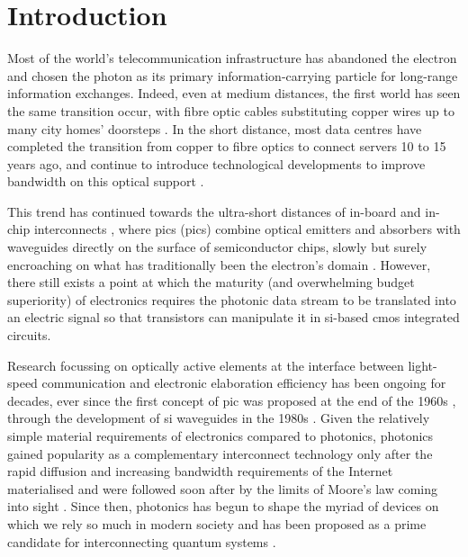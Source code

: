 \chapter{Introduction}
\label{chap:introduction}

Most of the world's telecommunication infrastructure has abandoned the electron and chosen the photon as its primary information-carrying particle for long-range information exchanges. Indeed, even at medium distances, the first world has seen the same transition occur, with fibre optic cables substituting copper wires up to many city homes' doorsteps \cite{ECBroadband, ETNOBroadband}. In the short distance, most data centres have completed the transition from copper to fibre optics to connect servers \num{10} to \num{15} years ago, and continue to introduce technological developments to improve bandwidth on this optical support \cite{Cheng2018}. 

This trend has continued towards the ultra-short distances of in-board and in-chip interconnects \cite{Benner2005}, where \acl{pic}s (\acs{pic}s) combine optical emitters and absorbers with waveguides directly on the surface of semiconductor chips, slowly but surely encroaching on what has traditionally been the electron's domain \cite{Shekhar2024, Margalit2021, Smit2019}. However, there still exists a point at which the maturity (and overwhelming budget superiority) of electronics requires the photonic data stream to be translated into an electric signal so that transistors can manipulate it in \acl{si}-based \acf{cmos} integrated circuits. 

Research focussing on optically active elements at the interface between light-speed communication and electronic elaboration efficiency has been ongoing for decades, ever since the first concept of \acs{pic} was proposed at the end of the 1960s \cite{Miller1969}, through the development of \acl{si} waveguides in the 1980s \cite{Soref1987}. Given the relatively simple material requirements of electronics compared to photonics, photonics gained popularity as a complementary interconnect technology only after the rapid diffusion and increasing bandwidth requirements of the Internet materialised and were followed soon after by the limits of Moore's law coming into sight \cite{Pathak2019}. Since then, photonics has begun to shape the myriad of devices on which we rely so much in modern society and has been proposed as a prime candidate for interconnecting quantum systems \cite{Luo2023}.

